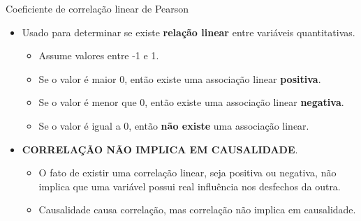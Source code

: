 \documentclass[
  ignorenonframetext,
  serif,
  professionalfont,
  usenames,
  dvipsnames,
  aspectratio = 169]{beamer}
\providecommand{\tightlist}{%
  \setlength{\itemsep}{0pt}\setlength{\parskip}{0pt}}
\renewcommand{\tightlist}{%
  \setlength{\itemsep}{0\baselineskip}
  \setlength{\parskip}{0.25\baselineskip}
}
\def\beginAHalfColumn{\begin{minipage}{0.49\textwidth}}%
\def\endColumns{\end{minipage}}%
\begin{document}
\begin{frame}{Coeficiente de correlação linear de Pearson}
\protect\hypertarget{coeficiente-de-correlauxe7uxe3o-linear-de-pearson}{}
\beginAHalfColumn

\begin{itemize}
\tightlist
\item
  Usado para determinar se existe \textbf{relação linear} entre
  variáveis quantitativas.

  \begin{itemize}
  \tightlist
  \item
    Assume valores entre -1 e 1.
  \item
    Se o valor é maior 0, então existe uma associação linear
    \textbf{positiva}.
  \item
    Se o valor é menor que 0, então existe uma associação linear
    \textbf{negativa}.
  \item
    Se o valor é igual a 0, então \textbf{não existe} uma associação
    linear.
  \end{itemize}
\end{itemize}

\endColumns
\beginAHalfColumn

\begin{itemize}
\tightlist
\item
  \textbf{CORRELAÇÃO NÃO IMPLICA EM CAUSALIDADE}.

  \begin{itemize}
  \tightlist
  \item
    O fato de existir uma correlação linear, seja positiva ou negativa,
    não implica que uma variável possui real influência nos desfechos da
    outra.
  \item
    Causalidade causa correlação, mas correlação não implica em
    causalidade.
  \end{itemize}
\end{itemize}

\endColumns
\end{frame}
\end{document}
